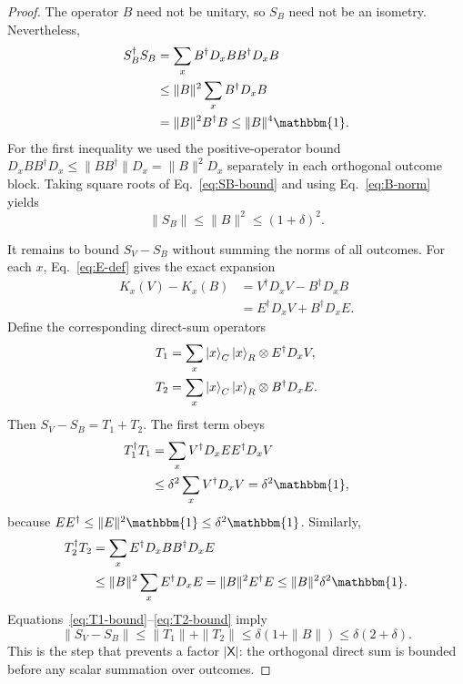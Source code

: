 \documentclass[aps,floatfix,10pt,amssymb,amsmath,superscriptaddress,nofootinbib,longbibliography,nobalancelastpage,twocolumn]{revtex4-2}
\newcommand{\id}{\mathbbm{1}}
\begin{document}
\begin{proof}
The operator $B$ need not be unitary, so $S_B$ need not be an isometry.  Nevertheless,
\begin{align}
 S_B^\dagger S_B
 &=\sum_xB^\dagger D_xBB^\dagger D_xB\nonumber\\
 &\leq\|B\|^2\sum_xB^\dagger D_xB\nonumber\\
 &=\|B\|^2B^\dagger B
 \leq\|B\|^4\id.
 \label{eq:SB-bound}
\end{align}
For the first inequality we used the positive-operator bound
$D_xBB^\dagger D_x\leq\|BB^\dagger\|D_x=\|B\|^2D_x$ separately in each orthogonal outcome block.  Taking square roots of Eq.~\eqref{eq:SB-bound} and using Eq.~\eqref{eq:B-norm} yields
\begin{equation}
 \|S_B\|\leq\|B\|^2\leq(1+\delta)^2.
 \label{eq:SB-norm}
\end{equation}

It remains to bound $S_V-S_B$ without summing the norms of all outcomes.  For each $x$, Eq.~\eqref{eq:E-def} gives the exact expansion
\begin{align}
 K_x(V)-K_x(B)
 &=V^\dagger D_xV-B^\dagger D_xB\nonumber\\
 &=E^\dagger D_xV+B^\dagger D_xE.
 \label{eq:K-difference}
\end{align}
Define the corresponding direct-sum operators
\begin{align}
 T_1&=\sum_x\ket{x}_C\ket{x}_R\otimes E^\dagger D_xV,\\
 T_2&=\sum_x\ket{x}_C\ket{x}_R\otimes B^\dagger D_xE.
\end{align}
Then $S_V-S_B=T_1+T_2$.  The first term obeys
\begin{align}
 T_1^\dagger T_1
 &=\sum_xV^\dagger D_xEE^\dagger D_xV\nonumber\\
 &\leq\delta^2\sum_xV^\dagger D_xV
 =\delta^2\id,
 \label{eq:T1-bound}
\end{align}
because $EE^\dagger\leq\|E\|^2\id\leq\delta^2\id$.  Similarly,
\begin{align}
 T_2^\dagger T_2
 &=\sum_xE^\dagger D_xBB^\dagger D_xE\nonumber\\
 &\leq\|B\|^2\sum_xE^\dagger D_xE
 =\|B\|^2E^\dagger E
 \leq\|B\|^2\delta^2\id.
 \label{eq:T2-bound}
\end{align}
Equations~\eqref{eq:T1-bound}--\eqref{eq:T2-bound} imply
\begin{equation}
 \|S_V-S_B\|\leq\|T_1\|+\|T_2\|
 \leq\delta(1+\|B\|)
 \leq\delta(2+\delta).
 \label{eq:S-difference}
\end{equation}
This is the step that prevents a factor $|\mathsf X|$: the orthogonal direct sum is bounded before any scalar summation over outcomes.


\end{proof}
\end{document}
